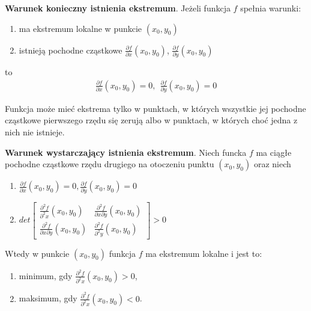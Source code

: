 \documentclass[12pt]{article}
\begin{document}
    \begin{theorem}
        \textbf{Warunek konieczny istnienia ekstremum}. Jeżeli funkcja $f$ spełnia warunki:
        \begin{enumerate}
            \item ma ekstremum lokalne w punkcie $(x_0, y_0)$
            \item istnieją pochodne cząstkowe $\frac{\partial f}{\partial x}(x_0, y_0)$, $\frac{\partial f}{\partial y}(x_0, y_0)$
        \end{enumerate}
        to
        \begin{align*}
            \frac{\partial f}{\partial x}(x_0, y_0) = 0, ~~ \frac{\partial f}{\partial y}(x_0, y_0) = 0
        \end{align*}

        Funkcja może mieć ekstrema tylko w punktach, w których wszystkie jej pochodne cząstkowe pierwszego rzędu się
        zerują albo w punktach, w których choć jedna z nich nie istnieje.
    \end{theorem}

    \begin{theorem}
        \textbf{Warunek wystarczający istnienia ekstremum}. Niech funcka $f$ ma ciągłe pochodne cząstkowe rzędu drugiego
        na otoczeniu punktu $(x_0, y_0)$ oraz niech
        \begin{enumerate}
            \item $\frac{\partial f}{\partial x}(x_0, y_0) = 0, \frac{\partial f}{\partial y}(x_0, y_0) = 0$
            \item $det \begin{bmatrix}
                           \frac{\partial^2 f}{\partial^2 x}(x_0, y_0) & \frac{\partial^2 f}{\partial x \partial y}(x_0, y_0) \\
                           \frac{\partial^2 f}{\partial x \partial y}(x_0, y_0) & \frac{\partial^2 f}{\partial^2 y}(x_0, y_0)
            \end{bmatrix} > 0$
        \end{enumerate}
        Wtedy w punkcie $(x_0, y_0)$ funkcja $f$ ma ekstremum lokalne i jest to:
        \begin{enumerate}
            \item minimum, gdy $\frac{\partial^2 f}{\partial^2 x}(x_0, y_0) > 0$,
            \item maksimum, gdy $\frac{\partial^2 f}{\partial^2 x}(x_0, y_0) < 0$.
        \end{enumerate}
    \end{theorem}
\end{document}
